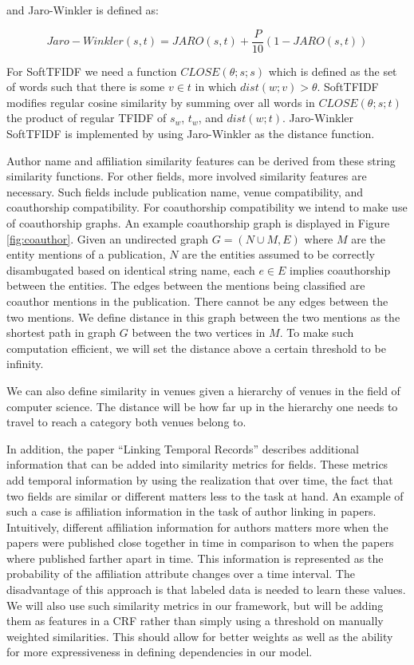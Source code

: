 \documentclass[twocolumn,letterpaper]{article}
\begin{document}
and Jaro-Winkler is defined as:
\begin{center}
\[
	Jaro-Winkler(s,t) = JARO(s,t) + \frac{P}{10}(1-JARO(s,t))
\]
\end{center}

For SoftTFIDF we need a function $CLOSE(\theta; s; s)$ which is defined as the set of words such that there is some $v \in t$ in which $dist(w; v) > \theta$. SoftTFIDF modifies regular cosine similarity by summing over all words in $CLOSE(\theta; s; t)$ the product of regular TFIDF of $s_w$, $t_w$, and $dist(w;t)$. Jaro-Winkler SoftTFIDF is implemented by using Jaro-Winkler as the distance function.

Author name and affiliation similarity features can be derived from these string similarity functions. For other fields, more involved similarity features are necessary. Such fields include publication name, venue compatibility, and coauthorship compatibility.  For coauthorship compatibility we intend to make use of coauthorship graphs. An example coauthorship graph is displayed in Figure \ref{fig:coauthor}. Given an undirected graph $G=(N \cup M,E)$ where $M$ are the entity mentions of a publication, $N$ are the entities assumed to be correctly disambugated based on identical string name, each $e \in E$ implies coauthorship between the entities. The edges between the mentions being classified are coauthor mentions in the publication. There cannot be any edges between the two mentions. We define distance in this graph between the two mentions as the shortest path in graph $G$ between the two vertices in $M$. To make such computation efficient, we will set the distance above a certain threshold to be infinity.

We can also define similarity in venues given a hierarchy of venues in the field of computer science. The distance will be how far up in the hierarchy one needs to travel to reach a category both venues belong to. 

In addition, the paper ``Linking Temporal Records'' \cite{DBLP:journals/fcsc/LiDMS12} describes additional information that can be added into similarity metrics for fields. These metrics add temporal information by using the realization that over time, the fact that two fields are similar or different matters less to the task at hand. An example of such a case is affiliation information in the task of author linking in papers. Intuitively, different affiliation information for authors matters more when the papers were published close together in time in comparison to when the papers where published farther apart in time. This information is represented as the probability of the affiliation attribute changes over a time interval. The disadvantage of this approach is that labeled data is needed to learn these values.  We will also use such similarity metrics in our framework, but will be adding them as features in a CRF rather than simply using a threshold on manually weighted similarities. This should allow for better weights as well as the ability for more expressiveness in defining dependencies in our model.
\end{document}
